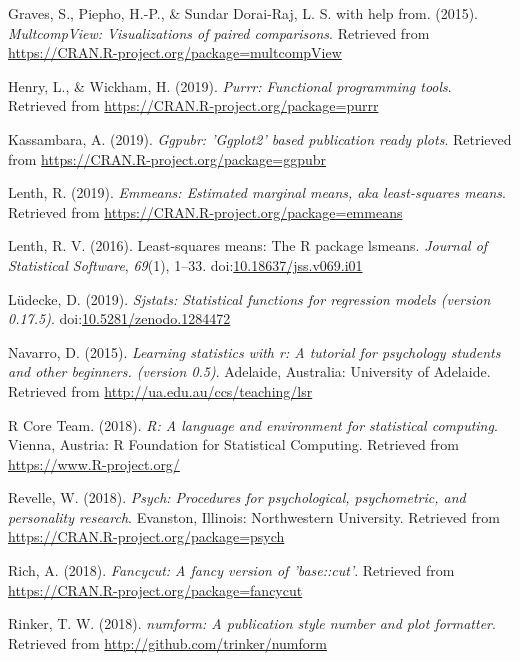 \documentclass[man]{apa6}
\begin{document}
\hypertarget{ref-R-multcompView}{}
Graves, S., Piepho, H.-P., \& Sundar Dorai-Raj, L. S. with help from.
(2015). \emph{MultcompView: Visualizations of paired comparisons}.
Retrieved from \url{https://CRAN.R-project.org/package=multcompView}

\hypertarget{ref-R-purrr}{}
Henry, L., \& Wickham, H. (2019). \emph{Purrr: Functional programming
tools}. Retrieved from \url{https://CRAN.R-project.org/package=purrr}

\hypertarget{ref-R-ggpubr}{}
Kassambara, A. (2019). \emph{Ggpubr: 'Ggplot2' based publication ready
plots}. Retrieved from \url{https://CRAN.R-project.org/package=ggpubr}

\hypertarget{ref-R-emmeans}{}
Lenth, R. (2019). \emph{Emmeans: Estimated marginal means, aka
least-squares means}. Retrieved from
\url{https://CRAN.R-project.org/package=emmeans}

\hypertarget{ref-R-lsmeans}{}
Lenth, R. V. (2016). Least-squares means: The R package lsmeans.
\emph{Journal of Statistical Software}, \emph{69}(1), 1--33.
doi:\href{https://doi.org/10.18637/jss.v069.i01}{10.18637/jss.v069.i01}

\hypertarget{ref-R-sjstats}{}
Lüdecke, D. (2019). \emph{Sjstats: Statistical functions for regression
models (version 0.17.5)}.
doi:\href{https://doi.org/10.5281/zenodo.1284472}{10.5281/zenodo.1284472}

\hypertarget{ref-R-lsr}{}
Navarro, D. (2015). \emph{Learning statistics with r: A tutorial for
psychology students and other beginners. (version 0.5)}. Adelaide,
Australia: University of Adelaide. Retrieved from
\url{http://ua.edu.au/ccs/teaching/lsr}

\hypertarget{ref-R-base}{}
R Core Team. (2018). \emph{R: A language and environment for statistical
computing}. Vienna, Austria: R Foundation for Statistical Computing.
Retrieved from \url{https://www.R-project.org/}

\hypertarget{ref-R-psych}{}
Revelle, W. (2018). \emph{Psych: Procedures for psychological,
psychometric, and personality research}. Evanston, Illinois:
Northwestern University. Retrieved from
\url{https://CRAN.R-project.org/package=psych}

\hypertarget{ref-R-fancycut}{}
Rich, A. (2018). \emph{Fancycut: A fancy version of 'base::cut'}.
Retrieved from \url{https://CRAN.R-project.org/package=fancycut}

\hypertarget{ref-R-numform}{}
Rinker, T. W. (2018). \emph{numform: A publication style number and plot
formatter}. Retrieved from \url{http://github.com/trinker/numform}
\end{document}

